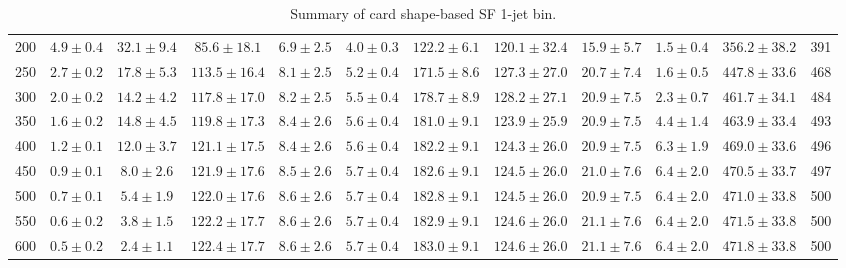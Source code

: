 \begin{table}
{\begin{center}
\begin{tabular}{l | c c | c c c c c c c | c c}
200 & $4.9\pm0.4$ & $32.1\pm9.4$ & $85.6\pm18.1$ & $6.9\pm2.5$ & $4.0\pm0.3$ & $122.2\pm6.1$ & $120.1\pm32.4$ & $15.9\pm5.7$ & $1.5\pm0.4$ & $356.2\pm38.2$ & 391 \\
250 & $2.7\pm0.2$ & $17.8\pm5.3$ & $113.5\pm16.4$ & $8.1\pm2.5$ & $5.2\pm0.4$ & $171.5\pm8.6$ & $127.3\pm27.0$ & $20.7\pm7.4$ & $1.6\pm0.5$ & $447.8\pm33.6$ & 468 \\
300 & $2.0\pm0.2$ & $14.2\pm4.2$ & $117.8\pm17.0$ & $8.2\pm2.5$ & $5.5\pm0.4$ & $178.7\pm8.9$ & $128.2\pm27.1$ & $20.9\pm7.5$ & $2.3\pm0.7$ & $461.7\pm34.1$ & 484 \\
350 & $1.6\pm0.2$ & $14.8\pm4.5$ & $119.8\pm17.3$ & $8.4\pm2.6$ & $5.6\pm0.4$ & $181.0\pm9.1$ & $123.9\pm25.9$ & $20.9\pm7.5$ & $4.4\pm1.4$ & $463.9\pm33.4$ & 493 \\
400 & $1.2\pm0.1$ & $12.0\pm3.7$ & $121.1\pm17.5$ & $8.4\pm2.6$ & $5.6\pm0.4$ & $182.2\pm9.1$ & $124.3\pm26.0$ & $20.9\pm7.5$ & $6.3\pm1.9$ & $469.0\pm33.6$ & 496 \\
450 & $0.9\pm0.1$ & $8.0\pm2.6$ & $121.9\pm17.6$ & $8.5\pm2.6$ & $5.7\pm0.4$ & $182.6\pm9.1$ & $124.5\pm26.0$ & $21.0\pm7.6$ & $6.4\pm2.0$ & $470.5\pm33.7$ & 497 \\
500 & $0.7\pm0.1$ & $5.4\pm1.9$ & $122.0\pm17.6$ & $8.6\pm2.6$ & $5.7\pm0.4$ & $182.8\pm9.1$ & $124.5\pm26.0$ & $20.9\pm7.5$ & $6.4\pm2.0$ & $471.0\pm33.8$ & 500 \\
550 & $0.6\pm0.2$ & $3.8\pm1.5$ & $122.2\pm17.7$ & $8.6\pm2.6$ & $5.7\pm0.4$ & $182.9\pm9.1$ & $124.6\pm26.0$ & $21.1\pm7.6$ & $6.4\pm2.0$ & $471.5\pm33.8$ & 500 \\
600 & $0.5\pm0.2$ & $2.4\pm1.1$ & $122.4\pm17.7$ & $8.6\pm2.6$ & $5.7\pm0.4$ & $183.0\pm9.1$ & $124.6\pm26.0$ & $21.1\pm7.6$ & $6.4\pm2.0$ & $471.8\pm33.8$ & 500 \\
\hline
\end{tabular}
\end{center}
}
\caption{Summary of card shape-based SF 1-jet bin.}
\end{table}
